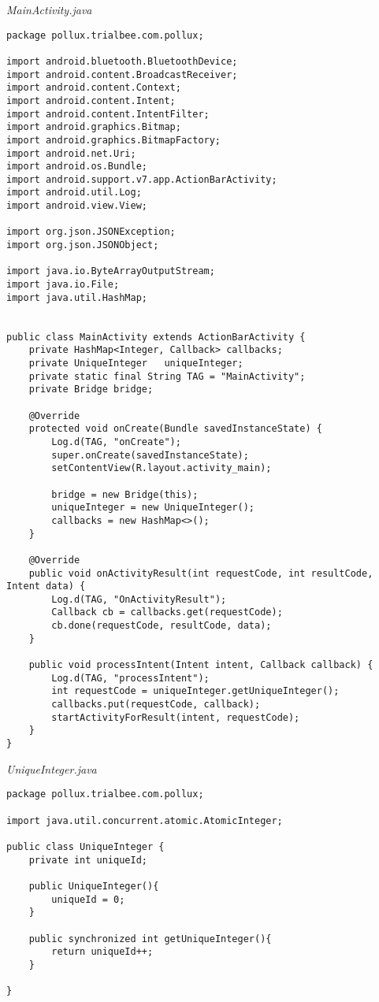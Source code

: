 \emph{MainActivity.java}
\begin{lstlisting}
package pollux.trialbee.com.pollux;

import android.bluetooth.BluetoothDevice;
import android.content.BroadcastReceiver;
import android.content.Context;
import android.content.Intent;
import android.content.IntentFilter;
import android.graphics.Bitmap;
import android.graphics.BitmapFactory;
import android.net.Uri;
import android.os.Bundle;
import android.support.v7.app.ActionBarActivity;
import android.util.Log;
import android.view.View;

import org.json.JSONException;
import org.json.JSONObject;

import java.io.ByteArrayOutputStream;
import java.io.File;
import java.util.HashMap;


public class MainActivity extends ActionBarActivity {
    private HashMap<Integer, Callback> callbacks;
    private UniqueInteger   uniqueInteger;
    private static final String TAG = "MainActivity";
    private Bridge bridge;

    @Override
    protected void onCreate(Bundle savedInstanceState) {
        Log.d(TAG, "onCreate");
        super.onCreate(savedInstanceState);
        setContentView(R.layout.activity_main);

        bridge = new Bridge(this);
        uniqueInteger = new UniqueInteger();
        callbacks = new HashMap<>();
    }

    @Override
    public void onActivityResult(int requestCode, int resultCode, Intent data) {
        Log.d(TAG, "OnActivityResult");
        Callback cb = callbacks.get(requestCode);
        cb.done(requestCode, resultCode, data);
    }

    public void processIntent(Intent intent, Callback callback) {
        Log.d(TAG, "processIntent");
        int requestCode = uniqueInteger.getUniqueInteger();
        callbacks.put(requestCode, callback);
        startActivityForResult(intent, requestCode);
    }
}
\end{lstlisting}
\emph{UniqueInteger.java}
\begin{lstlisting}
package pollux.trialbee.com.pollux;

import java.util.concurrent.atomic.AtomicInteger;

public class UniqueInteger {
    private int uniqueId;

    public UniqueInteger(){
        uniqueId = 0;
    }

    public synchronized int getUniqueInteger(){
        return uniqueId++;
    }

}
\end{lstlisting}
